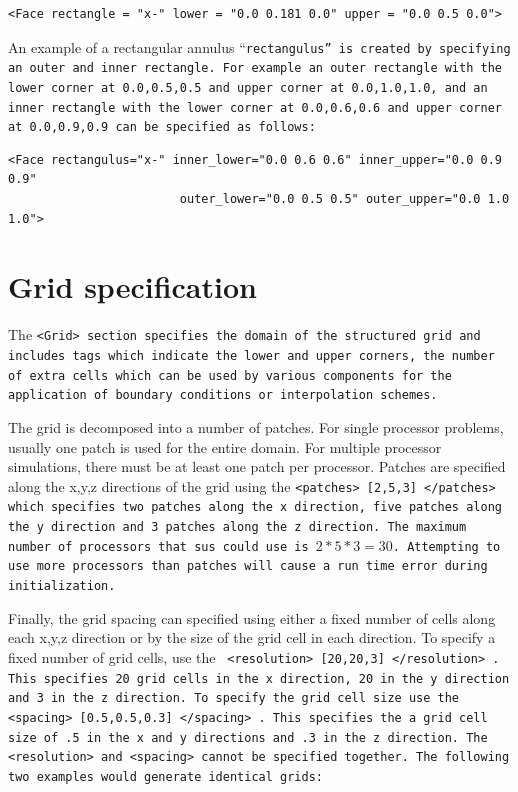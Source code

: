 \begin{Verbatim}[fontsize=\footnotesize]
 <Face rectangle = "x-" lower = "0.0 0.181 0.0" upper = "0.0 0.5 0.0">
\end{Verbatim}

An example of a rectangular annulus ``\tt rectangulus\normalfont'' is created by specifying an outer and inner \tt rectangle\normalfont. For example an outer rectangle with the
lower corner at 0.0,0.5,0.5 and upper corner at 0.0,1.0,1.0, and an inner rectangle with the lower corner at 0.0,0.6,0.6 and upper corner at 0.0,0.9,0.9 can be specified as follows:


\begin{Verbatim}[fontsize=\footnotesize]
 <Face rectangulus="x-" inner_lower="0.0 0.6 0.6" inner_upper="0.0 0.9 0.9"
                        outer_lower="0.0 0.5 0.5" outer_upper="0.0 1.0 1.0">
\end{Verbatim}


%
\section{Grid specification} \label{Sec:Grid}

The \tt <Grid> \normalfont section specifies the domain of the
structured grid and includes tags which indicate the lower and upper
corners, the number of extra cells which can be used by various
components for the application of boundary conditions or interpolation
schemes.

The grid is decomposed into a number of patches.  For single processor
problems, usually one patch is used for the entire domain.  For
multiple processor simulations, there must be at least one patch per
processor.  Patches are specified along the x,y,z directions of the
grid using the \tt <patches> [2,5,3] </patches> \normalfont which
specifies two patches along the x direction, five patches along the y
direction and 3 patches along the z direction.  The maximum number of
processors that \tt sus \normalfont could use is $2*5*3 = 30$.
Attempting to use more processors than patches
will cause a run time error during initialization.

Finally, the grid spacing can specified using either a fixed number of
cells along each x,y,z direction or by the size of the grid cell in
each direction.  To specify a fixed number of grid cells, use the \tt
<resolution> [20,20,3] </resolution> \normalfont.  This specifies 20
grid cells in the x direction, 20 in the y direction and 3 in the z
direction.  To specify the grid cell size use the \tt <spacing>
[0.5,0.5,0.3] </spacing> \normalfont.  This specifies the a grid cell
size of .5 in the x and y directions and .3 in the z direction.  The
\tt <resolution> \normalfont and \tt <spacing> \normalfont cannot be
specified together.  The following two examples would generate
identical grids:

